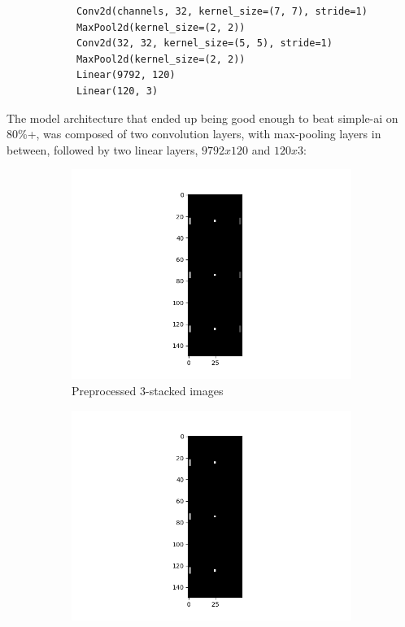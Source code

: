     \begin{verbatim}
            Conv2d(channels, 32, kernel_size=(7, 7), stride=1)
            MaxPool2d(kernel_size=(2, 2))
            Conv2d(32, 32, kernel_size=(5, 5), stride=1)
            MaxPool2d(kernel_size=(2, 2))
			Linear(9792, 120)
			Linear(120, 3)
	\end{verbatim}

\noindent
The model architecture that ended up being good enough to beat simple-ai on 80\%+, was composed of two convolution layers, with max-pooling layers in between, followed by two linear layers, $9792x120$ and $120x3$:






\begin{figure}[!htb]
    \centering
    \begin{subfigure}{.49\textwidth}
        \centering
        \includegraphics[width=\textwidth]{figures/dqn_training_image.png}
        \caption{Preprocessed 3-stacked images}
        \label{fig-raw}
    \end{subfigure}
    \begin{subfigure}{0.49\textwidth}
        \centering
        \includegraphics[width=\textwidth]{figures/dqn_training_image_blacked_out_pallet.png}

\end{subfigure}
\end{figure}
